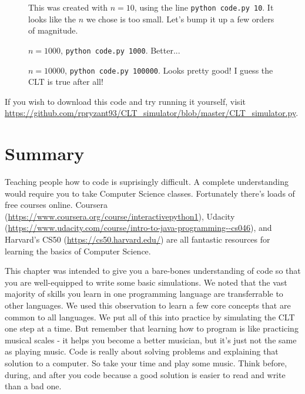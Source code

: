 \documentclass[a4paper]{article}
\begin{document}
\begin{figure}
\begin{center}
\caption{This was created with $n=10$, using the line \texttt{python code.py 10}. It looks like the $n$ we chose is too small. Let's bump it up a few orders of magnitude.}
\end{center}\end{figure}


\begin{figure}
\begin{center}
\caption{$n = 1000$, \texttt{python code.py 1000}. Better...}
\end{center}\end{figure}


\begin{figure}
\begin{center}
\caption{$n = 10000$, \texttt{python code.py 100000}. Looks pretty good! I guess the CLT is true after all!}
\end{center}\end{figure}

If you wish to download this code and try running it yourself, visit \url{https://github.com/rpryzant93/CLT_simulator/blob/master/CLT_simulator.py}.

\section{Summary}

Teaching people how to code is suprisingly difficult. A complete understanding would require you to take Computer Science classes. Fortunately there's loads of free courses online. Coursera (\url{https://www.coursera.org/course/interactivepython1}), Udacity (\url{https://www.udacity.com/course/intro-to-java-programming--cs046}), and Harvard's CS50 (\url{https://cs50.harvard.edu/}) are all fantastic resources for learning the basics of Computer Science.

This chapter was intended to give you a bare-bones understanding of code so that you are well-equipped to write some basic simulations. We noted that the vast majority of skills you learn in one programming language are transferrable to other languages. We used this observation to learn a few core concepts that are common to all languages. We put all of this into practice by simulating the CLT one step at a time. But remember that learning how to program is like practicing musical scales - it helps you become a better musician, but it's just not the same as playing music. Code is really about solving problems and explaining that solution to a computer. So take your time and play some music. Think before, during, and after you code because a good solution is easier to read and write than a bad one.
\end{document}
